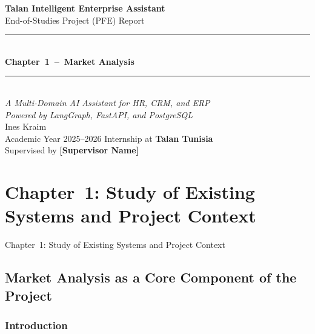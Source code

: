 \documentclass[12pt,a4paper]{report}
\begin{document}

\begin{titlepage}
\centering
\vspace*{2cm}
{\huge\bfseries\color{talannavy}
  Talan Intelligent Enterprise Assistant\\[0.5em]}
{\LARGE\color{talanblue}
  End-of-Studies Project (PFE) Report\\[1em]}
\noindent\rule{\linewidth}{1.5pt}\\[0.6em]
{\Large\bfseries
  Chapter~1~--~Market Analysis\\[2em]}
\noindent\rule{\linewidth}{0.4pt}\\[2em]
{\large\itshape
  A Multi-Domain AI Assistant for HR, CRM, and ERP\\
  Powered by LangGraph, FastAPI, and PostgreSQL\\[3em]}
{\large Ines Kraim\\[0.5em]}
{\normalsize Academic Year 2025--2026}
\vfill
{\small\color{talanblue}
  Internship at \textbf{Talan Tunisia}\\
  Supervised by \textbf{[Supervisor Name]}}
\end{titlepage}

\tableofcontents
\clearpage

\chapter*{Chapter~1: Study of Existing Systems and Project Context}
%
  {Chapter~1: Study of Existing Systems and Project Context}

\section{Market Analysis as a Core Component of the Project}

\subsection{Introduction}
\end{document}
